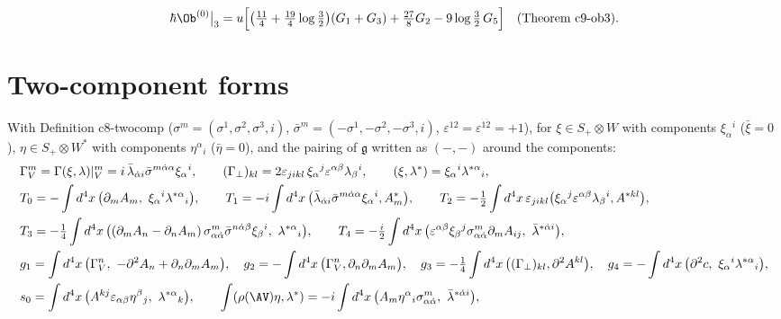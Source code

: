 \begin{equation}
\hbar\Ob^{(0)}\big|_3=u\Big[\big(\tfrac{11}4+\tfrac{19}4\log\tfrac32\big)(G_1+G_3)+\tfrac{27}8G_2-9\log\tfrac32\,G_5\Big]\quad(\text{Theorem c9-ob3}).
\label{eq:at-ob3}
\end{equation}

\section{Two-component forms}
\label{sec:at-twocomp}

\begin{remark}
\label{rem:at-twocomp}
With Definition c8-twocomp ($\sigma^m=(\sigma^1,\sigma^2,\sigma^3,i)$, $\bar\sigma^m=(-\sigma^1,-\sigma^2,-\sigma^3,i)$, $\varepsilon^{12}=\varepsilon^{\dot1\dot2}=+1$), for $\xi\in S_+\otimes W$ with components $\xi_\alpha{}^i$ ($\bar\xi=0$), $\eta\in S_+\otimes W^*$ with components $\eta^\alpha{}_i$ ($\bar\eta=0$), and the pairing of $\mathfrak g$ written as $(-,-)$ around the components:
\[
\begin{aligned}
&\Gamma_V^m=\Gamma(\xi,\lambda)|_V^m=i\,\bar\lambda_{\dot\alpha i}\bar\sigma^{m\dot\alpha\alpha}\xi_\alpha{}^i,\qquad (\Gamma_\perp)_{kl}=2\varepsilon_{jikl}\,\xi_\alpha{}^j\varepsilon^{\alpha\beta}\lambda_\beta{}^i,\qquad (\xi,\lambda^*)=\xi_\alpha{}^i\lambda^{*\alpha}{}_i,\\
&T_0=-\int d^4x\,\big(\partial_mA_m,\ \xi_\alpha{}^i\lambda^{*\alpha}{}_i\big),\qquad T_1=-i\int d^4x\,\big(\bar\lambda_{\dot\alpha i}\bar\sigma^{m\dot\alpha\alpha}\xi_\alpha{}^i,A^*_m\big),\qquad T_2=-\tfrac12\int d^4x\,\varepsilon_{jikl}\big(\xi_\alpha{}^j\varepsilon^{\alpha\beta}\lambda_\beta{}^i,A^{*kl}\big),\\
&T_3=-\tfrac14\int d^4x\,\big((\partial_mA_n-\partial_nA_m)\,\sigma^m_{\alpha\dot\alpha}\bar\sigma^{n\dot\alpha\beta}\xi_\beta{}^i,\ \lambda^{*\alpha}{}_i\big),\qquad T_4=-\tfrac i2\int d^4x\,\big(\varepsilon^{\alpha\beta}\xi_\beta{}^j\sigma^m_{\alpha\dot\alpha}\partial_mA_{ij},\ \bar\lambda^{*\dot\alpha i}\big),\\
&g_1=\int d^4x\,\big(\Gamma_V^n,\ -\partial^2A_n+\partial_n\partial_mA_m\big),\quad g_2=-\int d^4x\,\big(\Gamma_V^n,\partial_n\partial_mA_m\big),\quad g_3=-\tfrac14\int d^4x\,\big((\Gamma_\perp)_{kl},\partial^2A^{kl}\big),\quad g_4=-\int d^4x\,\big(\partial^2c,\ \xi_\alpha{}^i\lambda^{*\alpha}{}_i\big),\\
&s_0=\int d^4x\,\big(A^{kj}\varepsilon_{\alpha\beta}\eta^\beta{}_j,\ \lambda^{*\alpha}{}_k\big),\qquad \int(\rho(\AV)\eta,\lambda^*)=-i\int d^4x\,\big(A_m\eta^\alpha{}_i\sigma^m_{\alpha\dot\alpha},\ \bar\lambda^{*\dot\alpha i}\big),

\end{aligned}\]
\end{remark}
